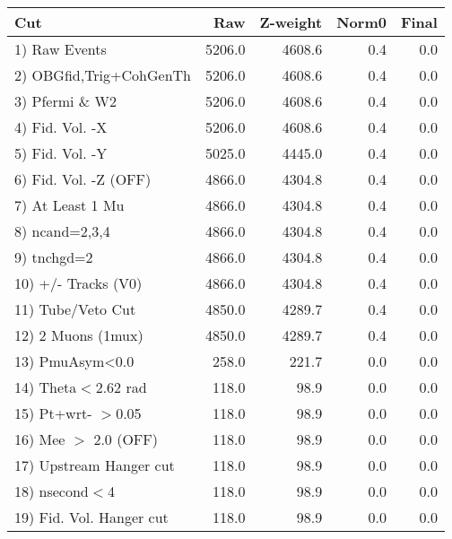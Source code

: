 \begin{table}[h!]\centering
 \begin{tabular}{||l||r|r|r|r||}
 \hline
 \hline
 Cut & Raw & Z-weight & Norm0 & Final \\
 \hline
  1) Raw Events           &      5206.0 &      4608.6 &         0.4 &         0.0 \\
  2) OBGfid,Trig+CohGenTh &      5206.0 &      4608.6 &         0.4 &         0.0 \\
  3) Pfermi \& W2         &      5206.0 &      4608.6 &         0.4 &         0.0 \\
  4) Fid. Vol. -X         &      5206.0 &      4608.6 &         0.4 &         0.0 \\
  5) Fid. Vol. -Y         &      5025.0 &      4445.0 &         0.4 &         0.0 \\
  6) Fid. Vol. -Z (OFF)   &      4866.0 &      4304.8 &         0.4 &         0.0 \\
  7) At Least 1 Mu        &      4866.0 &      4304.8 &         0.4 &         0.0 \\
  8) ncand=2,3,4          &      4866.0 &      4304.8 &         0.4 &         0.0 \\
  9) tnchgd=2             &      4866.0 &      4304.8 &         0.4 &         0.0 \\
 10) +/- Tracks (V0)      &      4866.0 &      4304.8 &         0.4 &         0.0 \\
 11) Tube/Veto Cut        &      4850.0 &      4289.7 &         0.4 &         0.0 \\
 12) 2 Muons (1mux)       &      4850.0 &      4289.7 &         0.4 &         0.0 \\
 13) PmuAsym<0.0          &       258.0 &       221.7 &         0.0 &         0.0 \\
 14) Theta$<$2.62 rad     &       118.0 &        98.9 &         0.0 &         0.0 \\
 15) Pt+wrt- $>$0.05      &       118.0 &        98.9 &         0.0 &         0.0 \\
 16) Mee $>$ 2.0  (OFF)   &       118.0 &        98.9 &         0.0 &         0.0 \\
 17) Upstream Hanger cut  &       118.0 &        98.9 &         0.0 &         0.0 \\
 18) nsecond$<$4          &       118.0 &        98.9 &         0.0 &         0.0 \\
 19) Fid. Vol. Hanger cut &       118.0 &        98.9 &         0.0 &         0.0 \\

\end{tabular}
\end{table}
